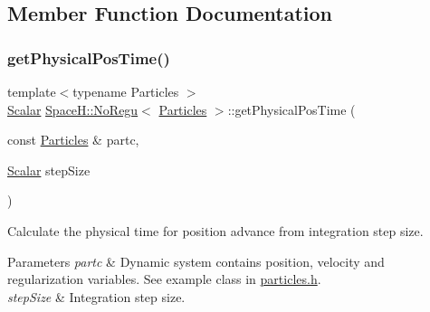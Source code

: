 \subsection{Member Function Documentation}
\mbox{\label{class_space_h_1_1_no_regu_abbf14013efeed4a2be9689e57cd1a9d7}} 
\subsubsection{\texorpdfstring{get\+Physical\+Pos\+Time()}{getPhysicalPosTime()}}
{\footnotesize\ttfamily template$<$typename Particles $>$ \\
\mbox{\hyperlink{class_space_h_1_1_no_regu_a1b9ea47811c5f906727b791ba67ff458}{Scalar}} \mbox{\hyperlink{class_space_h_1_1_no_regu}{Space\+H\+::\+No\+Regu}}$<$ \mbox{\hyperlink{struct_space_h_1_1_particles}{Particles}} $>$\+::get\+Physical\+Pos\+Time (\begin{DoxyParamCaption}\item[{const \mbox{\hyperlink{struct_space_h_1_1_particles}{Particles}} \&}]{partc,  }\item[{\mbox{\hyperlink{class_space_h_1_1_no_regu_a1b9ea47811c5f906727b791ba67ff458}{Scalar}}}]{step\+Size }\end{DoxyParamCaption})\hspace{0.3cm}{\ttfamily [inline]}}



Calculate the physical time for position advance from integration step size. 


\begin{DoxyParams}{Parameters}
{\em partc} & Dynamic system contains position, velocity and regularization variables. See example class in \mbox{\hyperlink{particles_8h}{particles.\+h}}. \\
\hline
{\em step\+Size} & Integration step size. \\
\hline
\end{DoxyParams}
\mbox{\label{class_space_h_1_1_no_regu_ad10e25f31d1f9519463a314f2f4155e6}} 
